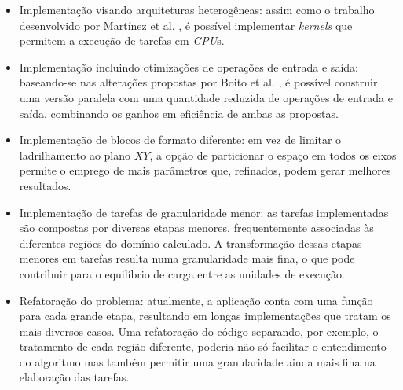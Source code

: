 \documentclass[cic,tc]{iiufrgs}
\begin{document}
\begin{itemize}
\item{Implementação visando arquiteturas heterogêneas:} assim como o trabalho desenvolvido por Martínez et al. \cite{victor}, é possível implementar \textit{kernels}
  que permitem a execução de tarefas em \textit{GPU}s.
\item{Implementação incluindo otimizações de operações de entrada e saída:} baseando-se nas alterações propostas por Boito et al. \cite{boito}, é possível construir uma versão
  paralela com uma quantidade reduzida de operações de entrada e saída, combinando os ganhos em eficiência de ambas as propostas.
\item{Implementação de blocos de formato diferente:} em vez de limitar o ladrilhamento ao plano $XY$, a opção de particionar o espaço em todos os eixos permite o
  emprego de mais parâmetros que, refinados, podem gerar melhores resultados.
\item{Implementação de tarefas de granularidade menor:} as tarefas implementadas são compostas por diversas etapas menores, frequentemente associadas às diferentes
  regiões do domínio calculado. A transformação dessas etapas menores em tarefas resulta numa granularidade mais fina, o que pode contribuir para o equilíbrio de carga
  entre as unidades de execução.
\item{Refatoração do problema:} atualmente, a aplicação conta com uma função para cada grande etapa, resultando em longas implementações que tratam os mais diversos casos.
  Uma refatoração do código separando, por exemplo, o tratamento de cada região diferente, poderia não só facilitar o entendimento do algoritmo mas também permitir uma
  granularidade ainda mais fina na elaboração das tarefas.
\end{itemize}
\end{document}
